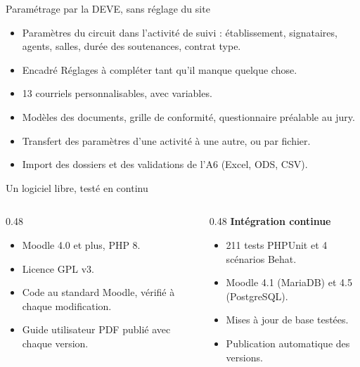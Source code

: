 \documentclass[aspectratio=169,11pt]{beamer}
\begin{document}
\begin{frame}{Paramétrage par la DEVE, sans réglage du site}
  \begin{itemize}
    \item \alert{Paramètres du circuit} dans l'activité de suivi : établissement, signataires, agents, salles, durée des soutenances, contrat type.
    \item Encadré \og Réglages à compléter\fg{} tant qu'il manque quelque chose.
    \item \alert{13 courriels personnalisables}, avec variables.
    \item Modèles des documents, grille de conformité, questionnaire préalable au jury.
    \item \alert{Transfert des paramètres} d'une activité à une autre, ou par fichier.
    \item Import des dossiers et des validations de l'A6 (Excel, ODS, CSV).
  \end{itemize}
\end{frame}

\begin{frame}{Un logiciel libre, testé en continu}
  \begin{columns}[T]
    \begin{column}{0.48\textwidth}
      \begin{itemize}
        \item Moodle 4.0 et plus, PHP 8.
        \item Licence \alert{GPL v3}.
        \item Code au standard Moodle, vérifié à chaque modification.
        \item Guide utilisateur PDF publié avec chaque version.
      \end{itemize}
    \end{column}
    \begin{column}{0.48\textwidth}
      \textbf{Intégration continue}
      \begin{itemize}
        \item \alert{211 tests} PHPUnit et 4 scénarios Behat.
        \item Moodle 4.1 (MariaDB) et 4.5 (PostgreSQL).
        \item Mises à jour de base testées.
        \item Publication automatique des versions.
      \end{itemize}
    \end{column}
  \end{columns}
\end{frame}
\end{document}
